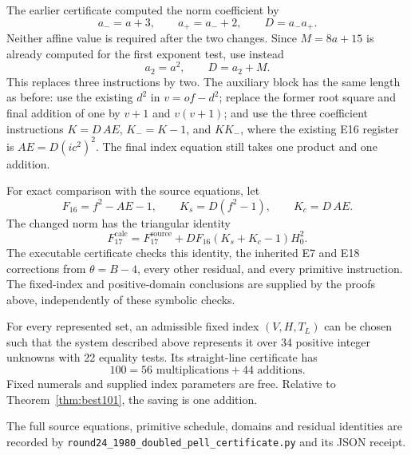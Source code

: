 The earlier certificate computed the norm coefficient by
\[
 a_-=a+3,\qquad a_+=a_-+2,\qquad D=a_-a_+.
\]
Neither affine value is required after the two changes. Since
$M=8a+15$ is already computed for the first exponent test, use instead
\[
 a_2=a^2,\qquad D=a_2+M.
\]
This replaces three instructions by two. The auxiliary block has the
same length as before: use the existing $d^2$ in $v=of-d^2$;
replace the former root square and final addition of one by $v+1$
and $v(v+1)$; and use the three coefficient instructions
$K=D\,AE$, $K_-=K-1$, and $KK_-$, where the existing E16 register
is $AE=D(ic^2)^2$. The final index equation still takes one product
and one addition.

For exact comparison with the source equations, let
\[
 F_{16}=f^2-AE-1,\qquad
 K_s=D(f^2-1),\qquad K_c=D\,AE.
\]
The changed norm has the triangular identity
\[
 F_{17}^{\mathrm{calc}}
 =F_{17}^{\mathrm{source}}
  +D F_{16}(K_s+K_c-1)H_0^2.
\]
The executable certificate checks this identity, the inherited E7 and
E18 corrections from $\theta=B-4$, every other residual, and every
primitive instruction. The fixed-index and positive-domain conclusions
are supplied by the proofs above, independently of these symbolic
checks.

\begin{theorem}\label{thm:best100-pell}
For every represented set, an admissible fixed index $(V,H,T_L)$
can be chosen such that the system described above represents it over
34 positive integer unknowns with 22 equality tests. Its straight-line
certificate has
\[
 \boxed{100=56\text{ multiplications}+44\text{ additions}}.
\]
Fixed numerals and supplied index parameters are free. Relative to
Theorem~\ref{thm:best101}, the saving is one addition.
\end{theorem}

The full source equations, primitive schedule, domains and residual
identities are recorded by
\texttt{round24\_1980\_doubled\_pell\_certificate.py} and its JSON receipt.

